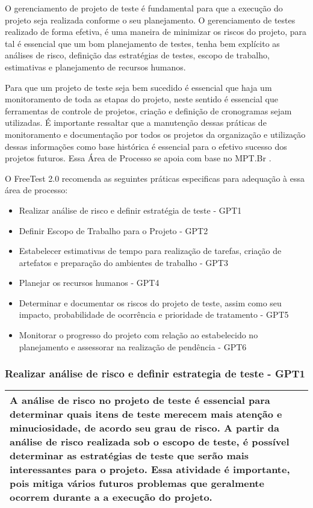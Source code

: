 O gerenciamento de projeto de teste é fundamental para que a execução do projeto seja realizada conforme o seu planejamento. O gerenciamento de testes realizado de forma efetiva, é uma maneira de minimizar os riscos do projeto, para tal é essencial que um bom planejamento de testes, tenha bem explícito as análises de risco, definição das estratégias de testes, escopo de trabalho, estimativas e planejamento de recursos humanos.

Para que um projeto de teste seja bem sucedido é essencial que haja um monitoramento de toda as etapas do projeto, neste sentido é essencial que ferramentas de controle de projetos, criação e definição de cronogramas sejam utilizadas. É importante ressaltar que a manutenção dessas práticas de monitoramento e documentação por todos os projetos da organização e utilização dessas informações como base histórica é essencial para o efetivo sucesso dos projetos futuros. Essa Área de Processo se apoia com base no MPT.Br \cite{GuiaMPTbr}.

O FreeTest 2.0 recomenda as seguintes práticas especificas para adequação à essa área de processo:

\begin{itemize}    
    \item Realizar análise de risco e definir estratégia de teste - GPT1
    \item Definir Escopo de Trabalho para o Projeto - GPT2
    \item Estabelecer estimativas de tempo para realização de tarefas, criação de artefatos e preparação do ambientes de trabalho - GPT3
    \item Planejar os recursos humanos - GPT4
    \item Determinar e documentar os riscos do projeto de teste, assim como seu impacto, probabilidade de ocorrência e prioridade de tratamento - GPT5
    \item Monitorar o progresso do projeto com relação ao estabelecido no planejamento e assessorar na realização de pendência - GPT6
\end{itemize}

\subsubsection{Realizar análise de risco e definir estrategia de teste - GPT1}
\label{sec:gpt1}

\begin{table}[!ht]
\centering
\begin{tabular}{|p{130mm}|}
\hline
A análise de risco no projeto de teste é essencial para determinar quais itens de teste merecem mais atenção e minuciosidade, de acordo seu grau de risco. A partir da análise de risco realizada sob o escopo de teste, é possível determinar as estratégias de teste que serão mais interessantes para o projeto. Essa atividade é importante, pois mitiga vários futuros problemas que geralmente ocorrem durante a a execução do projeto. \\
\hline
\end{tabular}
\end{table}

